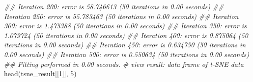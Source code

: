 \documentclass[]{article}
\newcommand{\hlnum}[1]{\textcolor[rgb]{0.816,0.125,0.439}{#1}}%
\newcommand{\hlcom}[1]{\textcolor[rgb]{0.502,0.502,0.502}{\textit{#1}}}%
\newcommand{\hlstd}[1]{\textcolor[rgb]{0.251,0.251,0.251}{#1}}%
\newcommand{\hlkwd}[1]{\textcolor[rgb]{0.878,0.439,0.125}{#1}}%
\newenvironment{Shaded}{\begin{myshaded}}{\end{myshaded}}
\newcommand{\KeywordTok}[1]{\hlkwd{#1}}
\newcommand{\DecValTok}[1]{\hlnum{#1}}
\newcommand{\CommentTok}[1]{\hlcom{#1}}
\newcommand{\NormalTok}[1]{\hlstd{#1}}
\begin{document}
\begin{Shaded}
\begin{Highlighting}[]
\CommentTok{## Iteration 200: error is 58.746613 (50 iterations in 0.00 seconds)}
\CommentTok{## Iteration 250: error is 55.783463 (50 iterations in 0.00 seconds)}
\CommentTok{## Iteration 300: error is 1.475388 (50 iterations in 0.00 seconds)}
\CommentTok{## Iteration 350: error is 1.079724 (50 iterations in 0.00 seconds)}
\CommentTok{## Iteration 400: error is 0.875064 (50 iterations in 0.00 seconds)}
\CommentTok{## Iteration 450: error is 0.634750 (50 iterations in 0.00 seconds)}
\CommentTok{## Iteration 500: error is 0.550634 (50 iterations in 0.00 seconds)}
\CommentTok{## Fitting performed in 0.00 seconds.}
\CommentTok{# view result: data frame of t-SNE data}
\KeywordTok{head}\NormalTok{(tsne_result[[}\DecValTok{1}\NormalTok{]], }\DecValTok{5}\NormalTok{)}
\end{Highlighting}
\end{Shaded}


  \providecommand{\huxb}[2]{\arrayrulecolor[RGB]{#1}\global\arrayrulewidth=#2pt}
  \providecommand{\huxvb}[2]{\color[RGB]{#1}\vrule width #2pt}
  \providecommand{\huxtpad}[1]{\rule{0pt}{#1}}
  \providecommand{\huxbpad}[1]{\rule[-#1]{0pt}{#1}}
\end{document}
